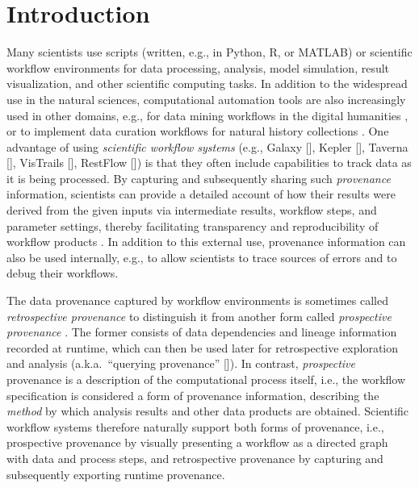 \documentclass[15]{ijdc-v9}
\newcommand{\R}{R}
\newcommand{\MATLAB}{MATLAB}
\begin{document}
\section{Introduction}

Many scientists use scripts (written, e.g., in Python, \R, or \MATLAB)
or scientific workflow environments for data processing, analysis,
model simulation, result visualization, and other scientific computing
tasks. In addition to the widespread use in the natural sciences,
computational automation tools are also increasingly used in other
domains, e.g., for data mining workflows in the digital humanities
\cite{van2012if}, or to implement data curation workflows for natural
history collections \cite{Dou2012kurator}. One advantage of using
\emph{scientific workflow systems} (e.g., Galaxy [],
Kepler [], Taverna [],
VisTrails [], RestFlow
[]) %
is that they often include capabilities to track data as it is being
processed. By capturing and subsequently sharing such
\emph{provenance} information, scientists can provide a detailed
account of how their results were derived from the given inputs via
intermediate results, workflow steps, and parameter settings, thereby
facilitating transparency and reproducibility of workflow products
\cite{stodden2014implementing}. 
In addition to this external use, provenance information can also be
used internally, e.g., to allow scientists to trace sources of errors
and to debug their workflows.

  The data provenance captured by workflow environments is sometimes
  called \emph{retrospective provenance} to distinguish it from
  another form called \emph{prospective provenance}
  \cite{Clifford2008original,Lim2010Prospective}. The former consists
  of data dependencies and lineage information recorded at runtime,
  which can then be used later for retrospective exploration and
  analysis (a.k.a.\ ``querying provenance''
  []). In contrast, \emph{prospective}
  provenance is a description of the computational process itself,
  i.e., the workflow specification is considered a form of provenance
  information, describing the \emph{method} by which analysis results
  and other data products are obtained. Scientific workflow systems
  therefore naturally support both forms of provenance, i.e.,
  prospective provenance by visually presenting a workflow as a
  directed graph with data and process steps, and retrospective
  provenance by capturing and subsequently exporting runtime
  provenance.
\end{document}
